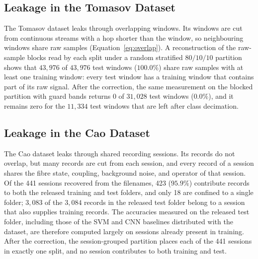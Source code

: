 \subsection{Leakage in the Tomasov Dataset}
\label{sec:resLeakageTomasov}
The Tomasov dataset leaks through overlapping windows. Its windows are cut from continuous streams with a hop shorter than the window, so neighbouring windows share raw samples (Equation~\eqref{eq:overlap}). A reconstruction of the raw-sample blocks read by each split under a random stratified $80/10/10$ partition shows that $43{,}976$ of $43{,}976$ test windows ($100.0\%$) share raw samples with at least one training window: every test window has a training window that contains part of its raw signal. After the correction, the same measurement on the blocked partition with guard bands returns $0$ of $31{,}028$ test windows ($0.0\%$), and it remains zero for the $11{,}334$ test windows that are left after class decimation.

\subsection{Leakage in the Cao Dataset}
\label{sec:resLeakageCao}
The Cao dataset leaks through shared recording sessions. Its records do not overlap, but many records are cut from each session, and every record of a session shares the fibre state, coupling, background noise, and operator of that session. Of the 441 sessions recovered from the filenames, 423 ($95.9\%$) contribute records to both the released training and test folders, and only 18 are confined to a single folder; $3{,}083$ of the $3{,}084$ records in the released test folder belong to a session that also supplies training records. The accuracies measured on the released test folder, including those of the SVM and CNN baselines distributed with the dataset, are therefore computed largely on sessions already present in training. After the correction, the session-grouped partition places each of the 441 sessions in exactly one split, and no session contributes to both training and test.

